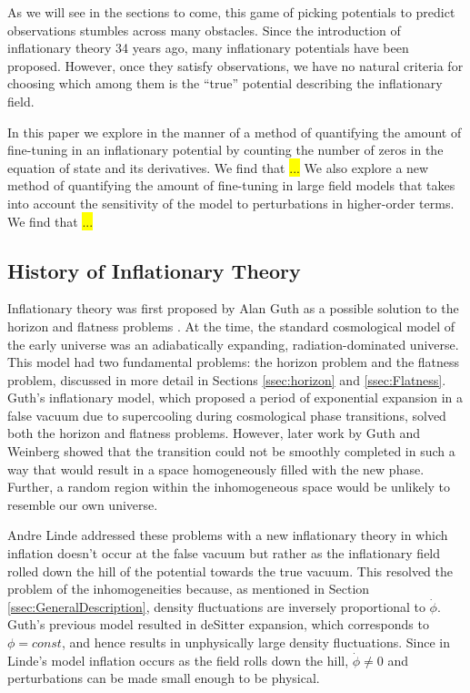 \documentclass[onecolumn,apj]{emulateapj}
\newcommand{\hl}[1]{\colorbox{yellow}{#1}}
\begin{document}
As we will see in the sections to come, this game of picking potentials to predict observations stumbles across many obstacles. Since the introduction of inflationary theory 34 years ago, many inflationary potentials have been proposed. However, once they satisfy observations, we have no natural criteria for choosing which among them is the ``true'' potential describing the inflationary field. 

In this paper we explore in the manner of \citet{Boyle+2006} a method of quantifying the amount of fine-tuning in an inflationary potential by counting the number of zeros in the equation of state and its derivatives. We find that \hl{...} We also explore a new method of quantifying the amount of fine-tuning in large field models that takes into account the sensitivity of the model to perturbations in higher-order terms. We find that \hl{...}

\subsection{History of Inflationary Theory}
\label{ssec:History}
Inflationary theory was first proposed by Alan Guth as a possible solution to the horizon and flatness problems \citep{Guth1981}. At the time, the standard cosmological model of the early universe was an adiabatically expanding, radiation-dominated universe. This model had two fundamental problems: the horizon problem and the flatness problem, discussed in more detail in Sections \ref{ssec:horizon} and \ref{ssec:Flatness}. Guth's inflationary model, which proposed a period of exponential expansion in a false vacuum due to supercooling during cosmological phase transitions, solved both the horizon and flatness problems.  However, later work by Guth and Weinberg \citep{Guth+Weinberg1983} showed that the transition could not be smoothly completed in such a way that would result in a space homogeneously filled with the new phase. Further, a random region within the inhomogeneous space would be unlikely to resemble our own universe. 

Andre Linde addressed these problems with a new inflationary theory in which inflation doesn't occur at the false vacuum but rather as the inflationary field rolled down the hill of the potential towards the true vacuum. This resolved the problem of the inhomogeneities because, as mentioned in Section \ref{ssec:GeneralDescription}, density fluctuations are inversely proportional to $\dot \phi$. Guth's previous model resulted in deSitter expansion, which corresponds to $\phi=const$, and hence results in unphysically large density fluctuations. Since in Linde's model inflation occurs as the field rolls down the hill, $\dot \phi \neq 0$ and perturbations can be made small enough to be physical. 
\end{document}
